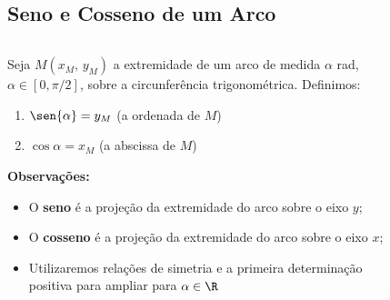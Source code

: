 \subsection{Seno e Cosseno de um Arco}
\begin{frame}
  \begin{columns}[onlytextwidth]
    \begin{column}{0.49\textwidth}\vspace{-0.5cm}
      \begin{definition}
        Seja $M(x_{M},\,y_{M})$ a extremidade de um arco de medida $\alpha$ rad, $\alpha\in[0,\pi/2]$, sobre a circunferência trigonométrica. Definimos:
        \begin{enumerate}
          \item $\displaystyle\sen{\alpha} = y_{M}$ (a ordenada de $M$)
          \item $\displaystyle\cos{\alpha} = x_{M}$ (a abscissa de $M$)
        \end{enumerate}
      \end{definition}
      \begin{highlight}
        \textbf{Observações:}
        \begin{itemize}
          \item O \textbf{seno} é a projeção da extremidade do arco sobre o eixo $y$;
          \item O \textbf{cosseno} é a projeção da extremidade do arco sobre o eixo $x$;
          \item Utilizaremos relações de simetria e a primeira determinação positiva para ampliar para $\alpha\in\R$
        \end{itemize}
      \end{highlight}
    \end{column}
    \begin{column}{0.49\textwidth}
      \vspace*{-0.5cm}
      \begin{figure}
      \end{figure}
    \end{column}
  \end{columns}
\end{frame}

